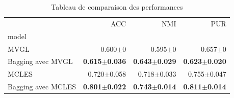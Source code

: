 	\begin{table}[h!]
  	  \caption{Tableau de comparaison des performances}
  	  \centering
  		  \begin{tabular}{lrrr}
  		  \toprule
   		  & ACC & NMI & PUR \\
  		  model &  &  &  \\
  		  \midrule
  		  MVGL & 0.600$\pm$0 & 0.595$\pm$0 & 0.657$\pm$0 \\
  		  Bagging avec MVGL & \textbf{0.615$\pm$0.036} & \textbf{0.643$\pm$0.029} & \textbf{0.623$\pm$0.020} \\
  		  MCLES & 0.720$\pm$0.058 & 0.718$\pm$0.033 & 0.755$\pm$0.047 \\
  		  Bagging avec MCLES & \textbf{0.801$\pm$0.022}& \textbf{0.743$\pm$0.014} & \textbf{0.811$\pm$0.014} \\
  		  \bottomrule
  		  \end{tabular}
  	  \label{table:perfs}
	\end{table}
    
